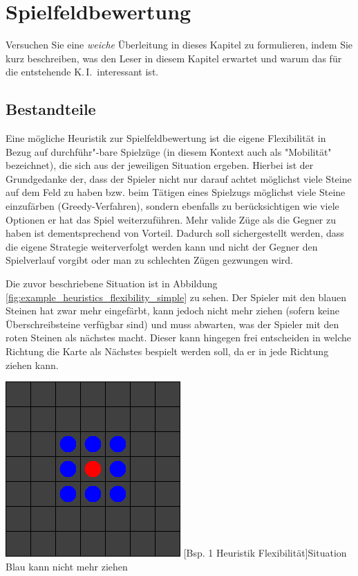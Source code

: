 \documentclass[12pt,a4paper,bibliography=totocnumbered,listof=totocnumbered]{article}
\begin{document}
\newpage
\section{Spielfeldbewertung}
Versuchen Sie eine \emph{weiche} Überleitung in dieses Kapitel zu formulieren, indem Sie kurz beschreiben, was den Leser in diesem Kapitel erwartet und warum das für die entstehende K.\,I.\ interessant ist.

\subsection{Bestandteile}\label{kap:Heuristik_Beschreibung}
Eine mögliche Heuristik zur Spielfeldbewertung ist die eigene Flexibilität in Bezug auf durchführ"-bare Spielzüge (in diesem Kontext auch als "Mobilität" bezeichnet), die sich aus der jeweiligen Situation ergeben. Hierbei ist der Grundgedanke der, dass der Spieler nicht nur darauf achtet möglichst viele Steine auf dem Feld zu haben bzw. beim Tätigen eines Spielzugs möglichst viele Steine einzufärben (Greedy-Verfahren), sondern ebenfalls zu berücksichtigen wie viele Optionen er hat das Spiel weiterzuführen. Mehr valide Züge als die Gegner zu haben ist dementsprechend von Vorteil. Dadurch soll sichergestellt werden, dass die eigene Strategie weiterverfolgt werden kann und nicht der Gegner den Spielverlauf vorgibt oder man zu \glqq schlechten\grqq{} Zügen gezwungen wird.

Die zuvor beschriebene Situation ist in Abbildung \ref{fig:example_heuristics_flexibility_simple} zu sehen. Der Spieler mit den blauen Steinen hat zwar mehr eingefärbt, kann jedoch nicht mehr ziehen (sofern keine Überschreibsteine verfügbar sind) und muss abwarten, was der Spieler mit den roten Steinen als nächstes macht. Dieser kann hingegen frei entscheiden in welche Richtung die Karte als Nächstes bespielt werden soll, da er in jede Richtung ziehen kann.

\vspace{1em}
\begin{minipage}{\linewidth}
	\centering
	\includegraphics[width=0.3\linewidth]{pics/heuristics_flexibility_simple.png}
	[Bsp. 1 Heuristik Flexibilität]{Situation Blau kann nicht mehr ziehen}
	\label{fig:example_heuristics_flexibility_simple}
\end{minipage}
\\
\end{document}
